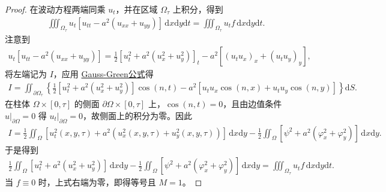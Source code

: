 \documentclass[../../main.tex]{subfiles}%
\begin{document}
\begin{proof}
在波动方程两端同乘 $u_t$，并在区域 $\Omega_\tau$ 上积分，得到
\begin{align*}
\iiint_{\Omega_\tau}u_t[u_{tt}-a^2(u_{xx}+u_{yy})]\,\mathrm{d}x\mathrm{d}y\mathrm{d}t=\iiint_{\Omega_\tau}u_tf\,\mathrm{d}x\mathrm{d}y\mathrm{d}t.
\end{align*}
注意到
\begin{align*}
u_t[u_{tt}-a^2(u_{xx}+u_{yy})]
=\frac{1}{2}[u_t^2+a^2(u_x^2+u_y^2)]_t-a^2[(u_tu_x)_x+(u_tu_y)_y],
\end{align*}
将左端记为 $I$，应用 \hyperref[Basis of Analytics-theorem:Gauss-Green公式(散度定理)]{Gauss-Green公式}得
\begin{align*}
I=\iint_{\partial\Omega_\tau}\left\{\frac{1}{2}[u_t^2+a^2(u_x^2+u_y^2)]\cos(n,t)-a^2[u_tu_x\cos(n,x)+u_tu_y\cos(n,y)]\right\}\mathrm{d}S.
\end{align*}
在柱体 $\Omega\times[0,\tau]$ 的侧面 $\partial\Omega\times[0,\tau]$ 上，$\cos(n,t)=0$，且由边值条件 $u|_{\partial\Omega}=0$ 得 $u_t|_{\partial\Omega}=0$，故侧面上的积分为零。因此
\begin{align*}
I=\frac{1}{2}\iint_\Omega [u_t^2(x,y,\tau)+a^2(u_x^2(x,y,\tau)+u_y^2(x,y,\tau))]\,\mathrm{d}x\mathrm{d}y
-\frac{1}{2}\iint_\Omega[\psi^2+a^2(\varphi_x^2+\varphi_y^2)]\,\mathrm{d}x\mathrm{d}y.
\end{align*}
于是得到
\begin{align}
\frac{1}{2}\iint_\Omega [u_t^2+a^2(u_x^2+u_y^2)]\,\mathrm{d}x\mathrm{d}y-\frac{1}{2}\iint_\Omega[\psi^2+a^2(\varphi_x^2+\varphi_y^2)]\,\mathrm{d}x\mathrm{d}y
=\iiint_{\Omega_\tau}u_tf\,\mathrm{d}x\mathrm{d}y\mathrm{d}t. \label{eq:energy-identity}
\end{align}
当 $f\equiv 0$ 时，上式右端为零，即得等号且 $M=1$。


\end{proof}
\end{document}
